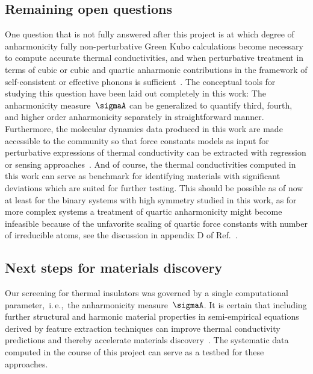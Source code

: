 \subsection{Remaining open questions}
\label{sec:outlook.open_questions}
One question that is not fully answered after this project is at which degree of anharmonicity fully non-perturbative Green Kubo calculations become necessary to compute accurate thermal conductivities, and when perturbative treatment in terms of cubic or cubic and quartic anharmonic contributions in the framework of self-consistent or effective phonons is sufficient~\cite{Hellman2013b,Feng2016,Tadano2018,Xia2018,Ravichandran2018}. The conceptual tools for studying this question have been laid out completely in this work: The anharmonicity measure~$\sigmaA$ can be generalized to quantify third, fourth, and higher order anharmonicity separately in straightforward manner. Furthermore, the molecular dynamics data produced in this work are made accessible to the community so that force constants models as input for perturbative expressions of thermal conductivity can be extracted with regression or sensing approaches~\cite{Zhou2014,Fransson2020}. And of course, the thermal conductivities computed in this work can serve as benchmark for identifying materials with significant deviations which are suited for further testing. This should be possible as of now at least for the binary systems with high symmetry studied in this work, as for more complex systems a treatment of quartic anharmonicity might become infeasible because of the unfavorite scaling of quartic force constants with number of irreducible atoms, see the discussion in appendix D of Ref.~\cite{Ravichandran2018}.

\subsection{Next steps for materials discovery}
Our screening for thermal insulators was governed by a single computational parameter,~i.\,e.,~the anharmonicity measure~$\sigmaA$. It is certain that including further structural and harmonic material properties in semi-empirical equations derived by feature extraction techniques can improve thermal conductivity predictions and thereby accelerate materials discovery~\cite{ouyang2018,goldsmith2017,Chen2019,Purcell2021}. The systematic data computed in the course of this project can serve as a testbed for these approaches.

